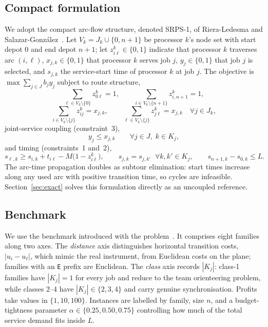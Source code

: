 \documentclass[11pt,a4paper]{article}
\newcommand{\Kj}{\ensuremath{K_j}}
\begin{document}
\subsection{Compact formulation}\label{sec:model}

We adopt the compact arc-flow structure, denoted SRPS-1, of Riera-Ledesma and
Salazar-Gonz\'alez~\cite{RieraLedesma2021SRPS}. Let $V_k=J_k\cup\{0,n+1\}$ be
processor $k$'s node set with start depot $0$ and end depot $n+1$; let
$z_{i\ell}^k\in\{0,1\}$ indicate that processor $k$ traverses arc $(i,\ell)$,
$x_{j,k}\in\{0,1\}$ that processor $k$ serves job $j$, $y_j\in\{0,1\}$ that job
$j$ is selected, and $s_{j,k}$ the service-start time of processor $k$ at job $j$.
The objective is $\max \sum_{j\in J} b_j y_j$ subject to route structure,
\[
\sum_{\ell\in V_k\setminus\{0\}} z_{0\ell}^k = 1,\qquad
\sum_{i\in V_k\setminus\{n+1\}} z_{i,n+1}^k = 1,
\]
\[
\sum_{i\in V_k\setminus\{j\}} z_{ij}^k = x_{j,k},\qquad
\sum_{\ell\in V_k\setminus\{j\}} z_{j\ell}^k = x_{j,k}
\quad \forall j\in J_k,
\]
joint-service coupling (constraint~3),
\[
y_j \le x_{j,k} \qquad \forall j\in J,\; k\in \Kj,
\]
and timing (constraints~1 and~2),
\[
s_{\ell,k} \ge s_{i,k} + t_{i\ell} - M\bigl(1-z_{i\ell}^k\bigr),
\qquad
s_{j,k}=s_{j,k'} \;\;\forall k,k'\in \Kj,
\qquad
s_{n+1,k}-s_{0,k} \le L .
\]
The arc-time propagation doubles as subtour elimination: start times increase
along any used arc with positive transition time, so cycles are infeasible.
Section~\ref{sec:exact} solves this formulation directly as an uncoupled
reference.

\subsection{Benchmark}\label{sec:benchmark}

We use the benchmark introduced with the problem~\cite{RieraLedesma2021SRPS}. It
comprises eight families along two axes. The \emph{distance} axis distinguishes
horizontal transition costs, $|u_i-u_\ell|$, which mimic the real instrument, from
Euclidean costs on the plane; families with an \texttt{E} prefix are Euclidean.
The \emph{class} axis records $|\Kj|$: class-1 families have $|\Kj|=1$ for every
job and reduce to the team orienteering problem, while classes 2--4 have
$|\Kj|\in\{2,3,4\}$ and carry genuine synchronisation. Profits take values in
$\{1,10,100\}$. Instances are labelled by family, size $n$, and a
budget-tightness parameter $\alpha\in\{0.25,0.50,0.75\}$ controlling how much of
the total service demand fits inside $L$.
\end{document}
